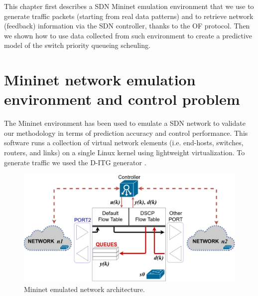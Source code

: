 This chapter first describes a SDN Mininet emulation environment that we use to generate traffic packets (starting from real data patterns) and to retrieve network (feedback) information via the SDN controller, thanks to the OF protocol. Then we shown how to use data collected from such environment to create a predictive model of the switch priority queueing scheuling.

\section{Mininet network emulation environment and control problem} \label{sec:SDNNetSim}
The Mininet environment \cite{Mininet} has been used to emulate a SDN network to validate our methodology in terms of prediction accuracy and control performance. This software runs a collection of virtual network elements (i.e. end-hosts, switches, routers, and links) on a single Linux kernel using lightweight virtualization. 
To generate traffic we used the D-ITG generator \cite{Avallone2004, Botta2012, Botta2013}.

\begin{figure}[tb!]
	\centering
	\includegraphics[keepaspectratio,width=\columnwidth]{figure/SDN_net_EPS.eps}
	\caption{Mininet emulated network architecture.}
	\label{fig:{Network}}
\end{figure}

